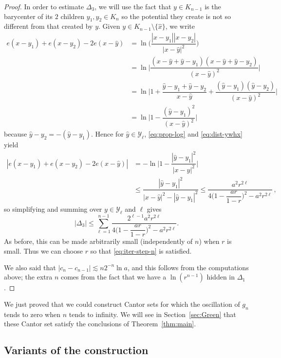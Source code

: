 \documentclass[10pt]{amsart}
\let\backslash\setminus
\let\wh\widehat
\numberwithin{equation}{section}
\theoremstyle{plain}
\theoremstyle{definition}
\newcommand{\cY}{{\mathcal Y}}
\begin{document}
\begin{proof}
In order to estimate $\Delta_3$, we will use the fact that $y\in K_{n-1}$ is the barycenter of its $2$
children $y_1,y_2\in K_n$ so the potential they create is not so different from that created by $y$.
Given $y\in K_{n-1}\backslash \{ \wh x\}$, we write\vspace*{-3pt}
\begin{align*}
e(x-y_1) + e(x-y_2) - 2e(x - \wh y)
&= \ln \Big ( \dfrac{|x-y_1||x-y_2|}{|x-\wh y|^2}\Big)
\\
&= \ln \Big | \dfrac{(x-\wh y + \wh y - y_1)(x-\wh y + \wh y - y_2)}{(x-\wh y)^2} \Big |\\
&= \ln \Big | 1 + \dfrac{ \wh y - y_1 + \wh y-y_2}{x-\wh y} + \dfrac{(\wh y - y_1)(\wh y-y_2)}{(x-\wh y)^2}\Big |\\
&= \ln \Big | 1 - \dfrac{(\wh y - y_1)^2}{(x-\wh y)^2}\Big |
\end{align*}
because $\wh y - y_2 = - (\wh y - y_1)$.
Hence for $\wh y\in \cY_\ell$, \eqref{eq:prop-log} and \eqref{eq:dist-ywhx} yield\vspace*{-3pt}
\begin{align*}
|e(x-y_1) + e(x-y_2) - 2e(x - \wh y)| &=-\ln\Big | 1 - \dfrac{|\wh y-y_1|^2}{|x- \wh y|^2}\Big|\\
&\le \dfrac{|\wh y-y_1|^2}{|x- \wh y|^2-|\wh y-y_1|^2}
\le \dfrac{ a^2r^{2 \ell}}{4\Big ( 1 - \dfrac{ar}{1-r}\Big )^2-a^2r^{2 \ell}} \, ,
\end{align*}
so simplifying and summing over $y\in \cY_\ell$ and $\ell$ gives\vspace*{-3pt}
\begin{equation}\label{eq:delta3-bound}
|\Delta_3| \le \sum_{\ell=1}^{n-1} \dfrac{2^{\ell-1} a^2 r^{2\ell}}{4\Big ( 1 - \dfrac{ar}{1-r}\Big )^2-a^2r^{2 \ell}}.
\end{equation}
As before, this can be made arbitrarily small (independently of $n$) when $r$ is small.
Thus we can choose $r$ so that \eqref{eq:iter-step-n} is satisfied.

We also said that $|c_n-c_{n-1}| \lesssim n 2^{-n}\ln a$, and this follows from the computations above; the extra
$n$ comes from the fact that we have a $\ln(r^{n-1})$ hidden in $\Delta_1$.
\end{proof}

We just proved that we could construct Cantor sets for which the oscillation of $g_n$ tends to zero when $n$ tends to infinity.
We will see in Section~\ref{sec:Green} that these Cantor set satisfy the conclusions of Theorem~\ref{thm:main}.

\subsection{Variants of the construction}
\label{sec:Npieces}
\end{document}
